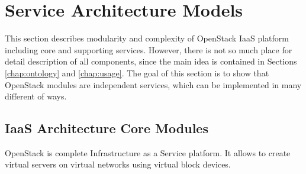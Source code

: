 
\section{Service Architecture Models}
\label{chap:service}



This section describes modularity and complexity of OpenStack IaaS platform including core and supporting services. However, there is not so much place for detail description of all components, since the main idea is contained in Sections \ref{chap:ontology} and \ref{chap:usage}. 
The goal of this section is to show that OpenStack modules are independent services, which can be implemented in many different of ways. 

\subsection{IaaS Architecture Core Modules}

OpenStack is complete Infrastructure as a Service platform. It allows to create virtual servers on virtual networks using virtual block devices.

